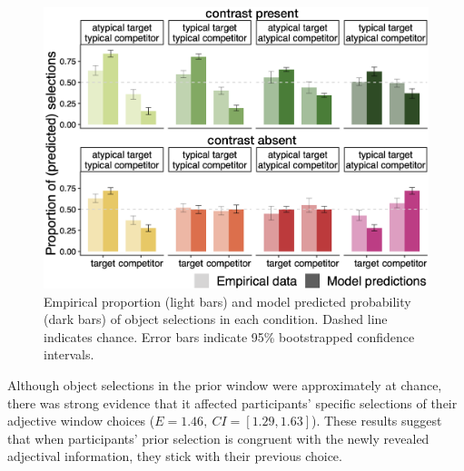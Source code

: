 \documentclass[10pt,letterpaper]{article}
\begin{document}

\begin{figure}
	\begin{center}
		\includegraphics[width=.475\textwidth]{graphs/model-bycond-paper.pdf}
	\end{center}
\caption{Empirical proportion (light bars) and model predicted probability (dark bars) of object selections in each condition. Dashed line indicates chance. Error bars indicate 95\% bootstrapped confidence intervals.} %
\label{modelcompr-results}
\end{figure}

Although object selections in the prior window were approximately at chance, there was strong evidence that it affected participants' specific selections of their adjective window choices ($E=1.46,\ CI=[1.29,1.63]$). These results suggest that when participants' prior selection is congruent with the newly revealed adjectival information, they stick with their previous choice. 

\end{document}
